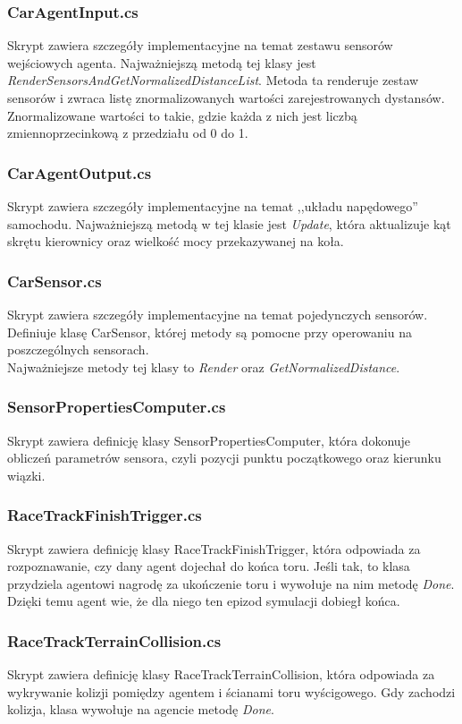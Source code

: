 \subsubsection{CarAgentInput.cs}
Skrypt zawiera szczegóły implementacyjne na temat zestawu sensorów wejściowych agenta. Najważniejszą metodą tej klasy jest \textit{RenderSensorsAndGetNormalizedDistanceList}. Metoda ta renderuje zestaw sensorów i zwraca listę znormalizowanych wartości zarejestrowanych dystansów. Znormalizowane wartości to takie, gdzie każda z nich jest liczbą zmiennoprzecinkową z przedziału od 0 do 1.

\subsubsection{CarAgentOutput.cs}
Skrypt zawiera szczegóły implementacyjne na temat ,,układu napędowego'' samochodu. Najważniejszą metodą w tej klasie jest \textit{Update}, która aktualizuje kąt skrętu kierownicy oraz wielkość mocy przekazywanej na koła.

\subsubsection{CarSensor.cs}
Skrypt zawiera szczegóły implementacyjne na temat pojedynczych sensorów. Definiuje klasę CarSensor, której metody są pomocne przy operowaniu na poszczególnych sensorach. \\ Najważniejsze metody tej klasy to \textit{Render} oraz \textit{GetNormalizedDistance}.

\subsubsection{SensorPropertiesComputer.cs}
Skrypt zawiera definicję klasy SensorPropertiesComputer, która dokonuje obliczeń parametrów sensora, czyli pozycji punktu początkowego oraz kierunku wiązki.

\subsubsection{RaceTrackFinishTrigger.cs}
Skrypt zawiera definicję klasy RaceTrackFinishTrigger, która odpowiada za rozpoznawanie, czy dany agent dojechał do końca toru.
Jeśli tak, to klasa przydziela agentowi nagrodę za ukończenie toru i wywołuje na nim metodę \textit{Done}. Dzięki temu agent wie, że dla niego ten epizod symulacji dobiegł końca.

\subsubsection{RaceTrackTerrainCollision.cs}
Skrypt zawiera definicję klasy RaceTrackTerrainCollision, która odpowiada za wykrywanie kolizji pomiędzy agentem i ścianami toru wyścigowego. Gdy zachodzi kolizja, klasa wywołuje na agencie metodę \textit{Done}.

